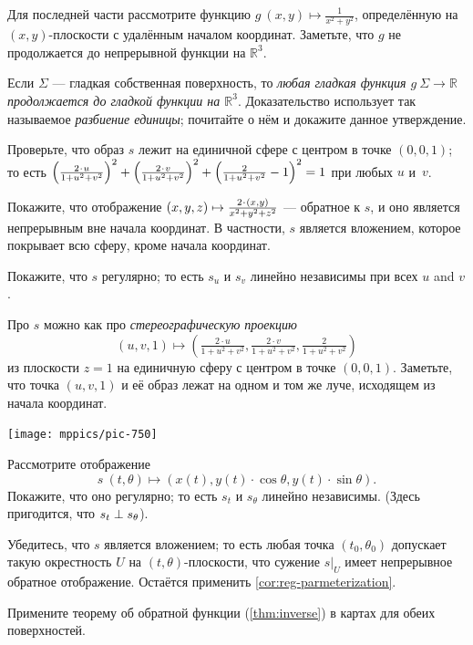 \begin{multicols}{2}
Для последней части рассмотрите функцию $g\:(x,y)\mapsto\tfrac1{x^2+y^2}$, определённую на $(x,y)$-плоскости с удалённым началом координат.
Заметьте, что $g$ не продолжается до непрерывной функции на $\mathbb{R}^3$.

Если $\Sigma$ --- гладкая собственная поверхность,
то \textit{любая гладкая функция $g\:\Sigma\to\mathbb{R}$ продолжается до гладкой функции на $\mathbb{R}^3$}.
Доказательство использует так называемое \emph{разбиение единицы};
почитайте о нём и докажите данное утверждение.

Проверьте, что образ $s$ лежит на единичной сфере с центром в точке $(0,0,1)$;
то есть $
\left(\tfrac{2\cdot u}{1+u^2+v^2}\right)^2
\z+
\left(\tfrac{2\cdot v}{1+u^2+v^2}\right)^2
\z+
\left(\tfrac{2}{1+u^2+v^2}-1\right)^2\z=1$
при любых $u$ и~$v$.

Покажите, что отображение 
$(x,y,z)\z\mapsto \tfrac{2\cdot(x,y)}{x^2+y^2+z^2}$
--- обратное к $s$, и оно является непрерывным вне начала координат.
В частности, $s$ является вложением, которое покрывает всю сферу, кроме начала координат.

Покажите, что $s$ регулярно; то есть $s_u$ и $s_v$ линейно независимы при всех $u$ and $v$.

Про $s$ можно как про \emph{стереографическую проекцию}
\[(u,v,1)\mapsto (\tfrac{2\cdot u}{1+u^2+v^2},\tfrac{2\cdot v}{1+u^2+v^2},\tfrac{2}{1+u^2+v^2})\]
из плоскости $z=1$ на единичную сферу с центром в точке $(0,0,1)$.
Заметьте, что точка $(u,v,1)$ и её образ лежат на одном и том же луче, исходящем из начала координат.

\begin{Figure}
\vskip-0mm
\centering
\texttt{[image: mppics/pic-750]}
\vskip0mm
\end{Figure}

Рассмотрите отображение
\[s\:(t,\theta)\mapsto (x(t), y(t)\cdot\cos\theta,y(t)\cdot\sin\theta).\]
Покажите, что оно регулярно; то есть $s_t$ и $s_\theta$ линейно независимы.
(Здесь пригодится, что $s_t\z\perp s_\theta$).

Убедитесь, что $s$ является вложением;
то есть любая точка $(t_0,\theta_0)$ допускает такую окрестность $U$ на $(t,\theta)$-плоскости, что сужение $s|_U$ имеет непрерывное обратное отображение.
Остаётся применить \ref{cor:reg-parmeterization}.

Примените теорему об обратной функции (\ref{thm:inverse}) в картах для обеих поверхностей.


\end{multicols}
